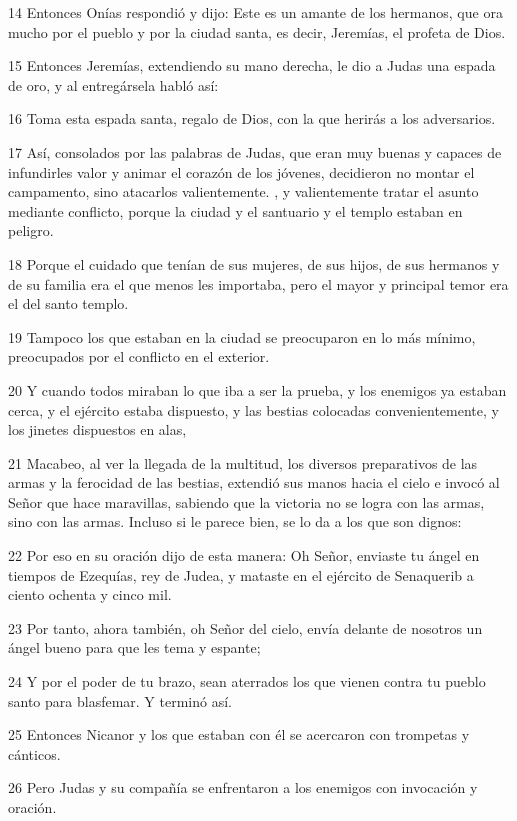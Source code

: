 \par 14 Entonces Onías respondió y dijo: Este es un amante de los hermanos, que ora mucho por el pueblo y por la ciudad santa, es decir, Jeremías, el profeta de Dios.
\par 15 Entonces Jeremías, extendiendo su mano derecha, le dio a Judas una espada de oro, y al entregársela habló así:
\par 16 Toma esta espada santa, regalo de Dios, con la que herirás a los adversarios.
\par 17 Así, consolados por las palabras de Judas, que eran muy buenas y capaces de infundirles valor y animar el corazón de los jóvenes, decidieron no montar el campamento, sino atacarlos valientemente. , y valientemente tratar el asunto mediante conflicto, porque la ciudad y el santuario y el templo estaban en peligro.
\par 18 Porque el cuidado que tenían de sus mujeres, de sus hijos, de sus hermanos y de su familia era el que menos les importaba, pero el mayor y principal temor era el del santo templo.
\par 19 Tampoco los que estaban en la ciudad se preocuparon en lo más mínimo, preocupados por el conflicto en el exterior.
\par 20 Y cuando todos miraban lo que iba a ser la prueba, y los enemigos ya estaban cerca, y el ejército estaba dispuesto, y las bestias colocadas convenientemente, y los jinetes dispuestos en alas,
\par 21 Macabeo, al ver la llegada de la multitud, los diversos preparativos de las armas y la ferocidad de las bestias, extendió sus manos hacia el cielo e invocó al Señor que hace maravillas, sabiendo que la victoria no se logra con las armas, sino con las armas. Incluso si le parece bien, se lo da a los que son dignos:
\par 22 Por eso en su oración dijo de esta manera: Oh Señor, enviaste tu ángel en tiempos de Ezequías, rey de Judea, y mataste en el ejército de Senaquerib a ciento ochenta y cinco mil.
\par 23 Por tanto, ahora también, oh Señor del cielo, envía delante de nosotros un ángel bueno para que les tema y espante;
\par 24 Y por el poder de tu brazo, sean aterrados los que vienen contra tu pueblo santo para blasfemar. Y terminó así.
\par 25 Entonces Nicanor y los que estaban con él se acercaron con trompetas y cánticos.
\par 26 Pero Judas y su compañía se enfrentaron a los enemigos con invocación y oración.
